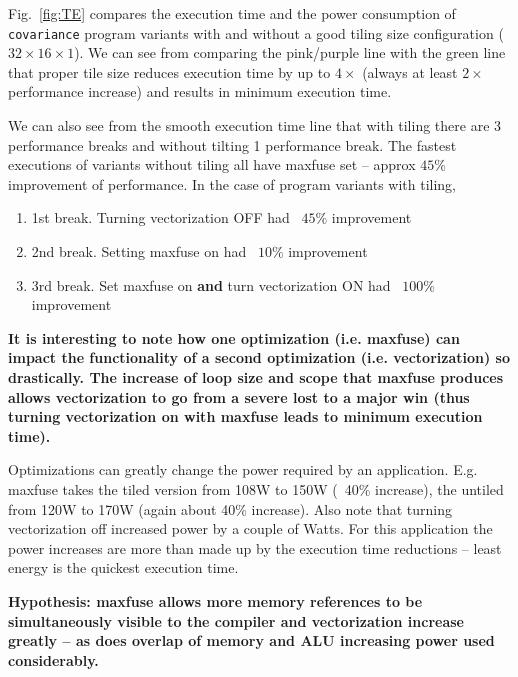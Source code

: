 Fig.~\ref{fig:TE} compares the execution time and the power consumption of 
\texttt{covariance} program variants with and without a good tiling size
configuration ($32\times16\times1$).
We can see from comparing the pink/purple line with the green line that 
proper tile size reduces execution time by up to $4\times$ (always 
at least $2\times$ performance increase) and results in
minimum execution time.  

We can also see from the smooth execution time line that 
with tiling there are 3 performance breaks and without tilting 1 performance break.
The fastest executions of variants without tiling all have maxfuse set -- approx $45\%$ improvement
of performance.
In the case of program variants with tiling, 
\begin{enumerate}
\item 1st break. Turning vectorization OFF had ~$45\%$ improvement 
\item 2nd break. Setting maxfuse on had ~$10\%$  improvement
\item 3rd break. Set maxfuse on \textbf{and} turn vectorization ON had ~$100\%$ improvement
\end{enumerate}
\textbf{It is interesting to note how one optimization (i.e. maxfuse) can impact the functionality
   of a second optimization (i.e. vectorization) so drastically. The increase of
loop size and scope that maxfuse produces allows vectorization to go from a severe lost to a major win 
(thus turning vectorization on with maxfuse leads to minimum execution time). }

Optimizations can greatly change the power required by an application. 
E.g. maxfuse takes the tiled version from 108W to 150W (~40\% increase), the untiled
from 120W to 170W (again about 40\% increase). Also note that turning vectorization 
off increased power by a couple of Watts.
For this application the power increases are more than made up by the execution
time reductions -- least energy is the quickest execution time.

\textbf{Hypothesis: maxfuse allows more memory references to be simultaneously
visible to the compiler and vectorization increase greatly -- as does overlap
of memory and ALU increasing power used considerably.}


